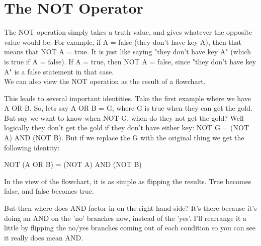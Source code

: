 \begin{center} \end{center}

\section{The NOT Operator}

The NOT operation simply takes a truth value, and gives whatever the opposite value would be. For example, if A = false (they don't have key A), then that means that NOT A = true. It is just like saying "they don't have key A" (which is true if A = false). If A = true, then NOT A = false, since "they don't have key A" is a false statement in that case.\\

We can also view the NOT operation as the result of a flowchart.

\begin{center} \end{center}

This leads to several important identities. Take the first example where we have A OR B. So, lets say A OR B = G, where G is true when they can get the gold. But say we want to know when NOT G, when do they not get the gold? Well logically they don't get the gold if they don't have either key: NOT G = (NOT A) AND (NOT B). But if we replace the G with the original thing we get the following identity:

\begin{center}
	NOT (A OR B) = (NOT A) AND (NOT B)
\end{center}

In the view of the flowchart, it is as simple as flipping the results. True becomes false, and false becomes true. 

\begin{center} \end{center}

But then where does AND factor in on the right hand side? It's there because it's doing an AND on the 'no' branches now, instead of the 'yes'. I'll rearrange it a little by flipping the no/yes branches coming out of each condition so you can see it really does mean AND.

\begin{center} \end{center}

